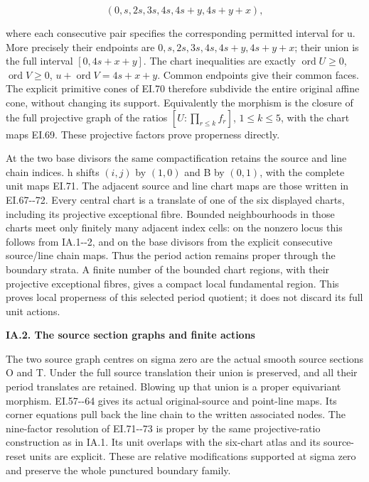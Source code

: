 \[
(0,s,2s,3s,4s,4s+y,4s+y+x),
\]

where each consecutive pair specifies the corresponding permitted
interval for u. More precisely their endpoints are
\(0,s,2s,3s,4s,4s+y,4s+y+x\); their union is the full interval
\([0,4s+x+y]\). The chart inequalities are exactly
\(\operatorname{ord}U\ge0\), \(\operatorname{ord}V\ge0\),
\(u+\operatorname{ord}V=4s+x+y\). Common endpoints give their
common faces. The explicit primitive cones of EI.70 therefore
subdivide the entire original affine cone, without changing its
support. Equivalently the morphism is the closure of the full
projective graph of the ratios
\([U:\prod_{r\le k}f_r]\), \(1\le k\le5\), with the chart
maps EI.69. These projective factors prove properness directly.

At the two base divisors the same compactification retains the
source and line chain indices. h shifts \((i,j)\) by \((1,0)\)
and B by \((0,1)\), with the complete unit maps EI.71. The
adjacent source and line chart maps are those written in EI.67-\/-72.
Every central chart is a translate of one of the six displayed
charts, including its projective exceptional fibre. Bounded
neighbourhoods in those charts meet only finitely many adjacent
index cells: on the nonzero locus this follows from IA.1-\/-2, and
on the base divisors from the explicit consecutive source/line
chain maps. Thus the period action remains proper through the
boundary strata. A finite number of the bounded chart regions,
with their projective exceptional fibres, gives a compact local
fundamental region. This proves local properness of this selected
period quotient; it does not discard its full unit actions.

\par

\medskip\noindent\textbf{IA.2. The source section graphs and finite actions}

\par\nobreak

The two source graph centres on sigma zero are the actual smooth
source sections O and T. Under the full source translation their
union is preserved, and all their period translates are retained.
Blowing up that union is a proper equivariant morphism. EI.57-\/-64
gives its actual original-source and point-line maps. Its corner
equations pull back the line chain to the written associated
nodes. The nine-factor resolution of EI.71-\/-73 is proper by the
same projective-ratio construction as in IA.1. Its unit overlaps
with the six-chart atlas and its source-reset units are explicit.
These are relative modifications supported at sigma zero and
preserve the whole punctured boundary family.

